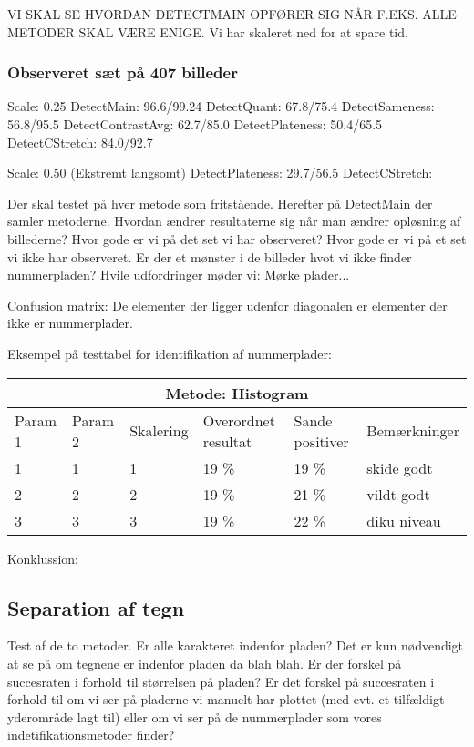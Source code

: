 VI SKAL SE HVORDAN DETECTMAIN OPFØRER SIG NÅR F.EKS. ALLE METODER SKAL VÆRE ENIGE.
 Vi har skaleret ned for at spare tid.

\subsubsection*{Observeret sæt på 407 billeder}
Scale: 0.25
DetectMain: 96.6/99.24
DetectQuant: 67.8/75.4
DetectSameness: 56.8/95.5
DetectContrastAvg: 62.7/85.0
DetectPlateness: 50.4/65.5
DetectCStretch: 84.0/92.7

Scale: 0.50 (Ekstremt langsomt)
DetectPlateness: 29.7/56.5
DetectCStretch:

Der skal testet på hver metode som fritstående. Herefter på DetectMain der samler metoderne. Hvordan ændrer resultaterne sig når man ændrer opløsning af billederne?
Hvor gode er vi på det set vi har observeret? Hvor gode er vi på et set vi ikke har observeret. Er der et mønster i de billeder hvot vi ikke finder nummerpladen? Hvile udfordringer møder vi: Mørke plader... 

Confusion matrix: De elementer der ligger udenfor diagonalen er elementer der ikke er nummerplader.

Eksempel på testtabel for identifikation af nummerplader:

\begin{tabular}{|l|l|l|l|l|l|}
\hline
\multicolumn{6}{|c|}{Metode: Histogram} \\ \hline
Param 1 & Param 2 & Skalering & Overordnet resultat & Sande positiver & Bemærkninger\\ \hline
1 & 1 & 1 & 19 \% & 19 \% & skide godt\\ \hline
2 & 2 & 2 & 19 \% & 21 \% & vildt godt \\ \hline
3 & 3 & 3 & 19 \% & 22 \% & diku niveau \\
\hline
\end{tabular}

Konklussion:

\subsection{Separation af tegn}
Test af de to metoder.
Er alle karakteret indenfor pladen? Det er kun nødvendigt at se på om tegnene er indenfor pladen da blah blah. Er der forskel på succesraten i forhold til størrelsen på pladen? Er det forskel på succesraten i forhold til om vi ser på pladerne vi manuelt har plottet (med evt. et tilfældigt yderområde lagt til) eller om vi ser på de nummerplader som vores indetifikationsmetoder finder?

